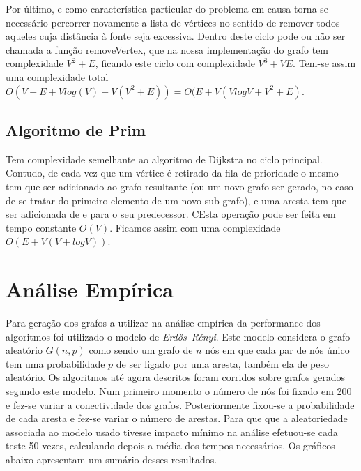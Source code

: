 \documentclass[a4paper,12pt,titlepage]{article}
\begin{document}
Por último, e como característica particular do problema em causa torna-se necessário percorrer novamente a lista de vértices no sentido de remover todos aqueles cuja distância à fonte seja excessiva. Dentro deste ciclo pode ou não ser chamada a função removeVertex, que na nossa implementação do grafo tem complexidade $V^2+ E$, ficando este ciclo com complexidade $V^3+VE$. Tem-se assim uma complexidade total $O(V+E+Vlog(V)+V(V^2+E)) = O(E+V(VlogV+V^2+E)$.
\subsection{Algoritmo de Prim}
Tem complexidade semelhante ao algoritmo de Dijkstra no ciclo principal. Contudo, de cada vez que um vértice é retirado da fila de prioridade o mesmo tem que ser adicionado ao grafo resultante (ou um novo grafo ser gerado, no caso de se tratar do primeiro elemento de um novo sub grafo), e uma aresta tem que ser adicionada de e para o seu predecessor. CEsta operação pode ser feita em tempo constante $O(V)$. Ficamos assim com uma complexidade $O(E+V(V+ logV))$.

\section{Análise Empírica}
Para geração dos grafos a utilizar na análise empírica da performance dos algoritmos foi utilizado o modelo de \emph{Erdős–Rényi}. Este modelo considera o grafo aleatório $G(n,p)$ como sendo um grafo de $n$ nós em que cada par de nós único tem uma probabilidade $p$ de ser ligado por uma aresta, também ela de peso aleatório. Os algoritmos até agora descritos foram corridos sobre grafos gerados segundo este modelo. Num primeiro momento o número de nós foi fixado em 200 e fez-se variar a conectividade dos grafos. Posteriormente fixou-se a probabilidade de cada aresta e fez-se variar o número de arestas. Para que que a aleatoriedade associada ao modelo usado tivesse impacto mínimo na análise efetuou-se cada teste 50 vezes, calculando depois a média dos tempos necessários. Os gráficos abaixo apresentam um sumário desses resultados.
\newpage


\end{document}

